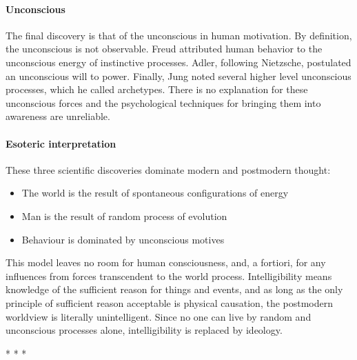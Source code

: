 \paragraph{Unconscious}


The final discovery is that of the unconscious in human motivation. By definition, the unconscious is not observable. Freud attributed human behavior to the unconscious energy of instinctive processes. Adler, following Nietzsche, postulated an unconscious will to power. Finally, Jung noted several higher level unconscious processes, which he called archetypes. There is no explanation for these unconscious forces and the psychological techniques for bringing them into awareness are unreliable.

\paragraph{Esoteric interpretation}


These three scientific discoveries dominate modern and postmodern thought:

\begin{itemize}


\item The world is the result of spontaneous configurations of energy

\item Man is the result of random process of evolution

\item Behaviour is dominated by unconscious motives
\end{itemize}


This model leaves no room for human consciousness, and, a fortiori, for any influences from forces transcendent to the world process. Intelligibility means knowledge of the sufficient reason for things and events, and as long as the only principle of sufficient reason acceptable is physical causation, the postmodern worldview is literally unintelligent. Since no one can live by random and unconscious processes alone, intelligibility is replaced by ideology.



\begin{center}* * *\end{center}

